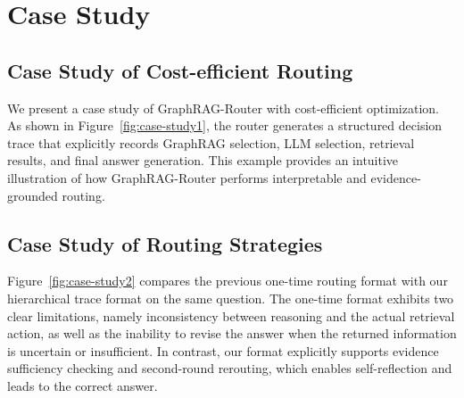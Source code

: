 \section{Case Study}
\label{appendix:case_study}

\subsection{Case Study of Cost-efficient Routing}

We present a case study of GraphRAG-Router with cost-efficient optimization. As shown in Figure~\ref{fig:case-study1}, the router generates a structured decision trace that explicitly records GraphRAG selection, LLM selection, retrieval results, and final answer generation. This example provides an intuitive illustration of how GraphRAG-Router performs interpretable and evidence-grounded routing.

\subsection{Case Study of Routing Strategies}
Figure~\ref{fig:case-study2} compares the previous one-time routing format with our hierarchical trace format on the same question. The one-time format exhibits two clear limitations, namely inconsistency between reasoning and the actual retrieval action, as well as the inability to revise the answer when the returned information is uncertain or insufficient. In contrast, our format explicitly supports evidence sufficiency checking and second-round rerouting, which enables self-reflection and leads to the correct answer.


